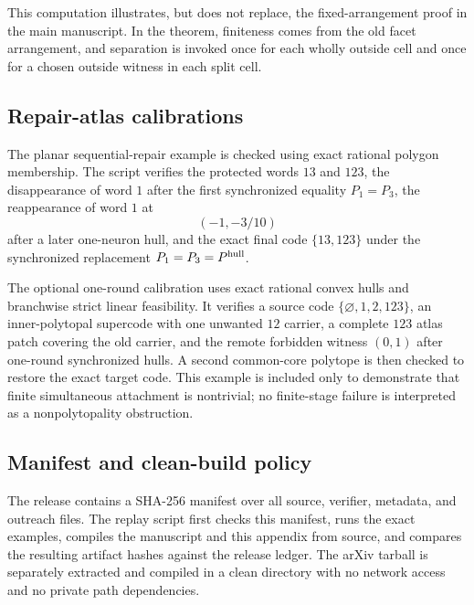This computation illustrates, but does not replace, the fixed-arrangement proof in the main manuscript.  In the theorem, finiteness comes from the old facet arrangement, and separation is invoked once for each wholly outside cell and once for a chosen outside witness in each split cell.

\subsection{Repair-atlas calibrations}

The planar sequential-repair example is checked using exact rational polygon membership.  The script verifies the protected words $13$ and $123$, the disappearance of word $1$ after the first synchronized equality $P_1=P_3$, the reappearance of word $1$ at
\[
 (-1,-3/10)
\]
after a later one-neuron hull, and the exact final code $\{13,123\}$ under the synchronized replacement $P_1=P_3=P^{\rm hull}$.

The optional one-round calibration uses exact rational convex hulls and branchwise strict linear feasibility.  It verifies a source code $\{\varnothing,1,2,123\}$, an inner-polytopal supercode with one unwanted $12$ carrier, a complete $123$ atlas patch covering the old carrier, and the remote forbidden witness $(0,1)$ after one-round synchronized hulls.  A second common-core polytope is then checked to restore the exact target code.  This example is included only to demonstrate that finite simultaneous attachment is nontrivial; no finite-stage failure is interpreted as a nonpolytopality obstruction.

\subsection{Manifest and clean-build policy}

The release contains a SHA-256 manifest over all source, verifier, metadata, and outreach files.  The replay script first checks this manifest, runs the exact examples, compiles the manuscript and this appendix from source, and compares the resulting artifact hashes against the release ledger.  The arXiv tarball is separately extracted and compiled in a clean directory with no network access and no private path dependencies.

